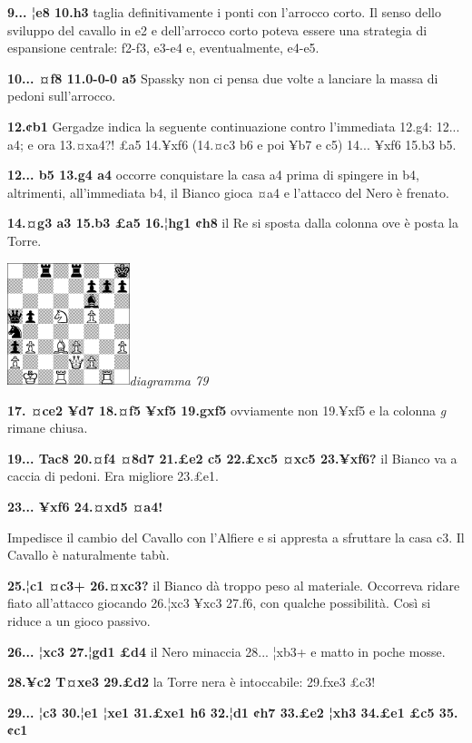 \documentclass[
]{article}
\begin{document}
\textbf{9... ¦e8 10.h3} taglia definitivamente i ponti con l'arrocco
corto. Il senso dello sviluppo del cavallo in e2 e dell'arrocco corto
poteva essere una strategia di espansione centrale: f2-f3, e3-e4 e,
eventualmente, e4-e5.

\textbf{10... ¤f8 11.0-0-0 a5} Spassky non ci pensa due volte a lanciare
la massa di pedoni sull'arrocco.

\textbf{12.¢b1} Gergadze indica la seguente continuazione contro
l'immediata 12.g4: 12... a4; e ora 13.¤xa4?! £a5 14.¥xf6 (14.¤c3 b6 e
poi ¥b7 e c5) 14... ¥xf6 15.b3 b5.

\textbf{12... b5 13.g4 a4} occorre conquistare la casa a4 prima di
spingere in b4, altrimenti, all'immediata b4, il Bianco gioca ¤a4 e
l'attacco del Nero è frenato.

\textbf{14.¤g3 a3 15.b3 £a5 16.¦hg1 ¢h8} il Re si sposta dalla colonna
ove è posta la Torre.

\includegraphics[width=1.40139in,height=1.40139in]{vertopal_109f12be458a423d8f3cc838880eaea2/media/image79.png}\emph{diagramma
79}

\textbf{17. ¤ce2 ¥d7 18.¤f5 ¥xf5 19.gxf5} ovviamente non 19.¥xf5 e la
colonna \emph{g} rimane chiusa.

\textbf{19... Tac8 20.¤f4 ¤8d7 21.£e2 c5 22.£xc5 ¤xc5 23.¥xf6?} il
Bianco va a caccia di pedoni. Era migliore 23.£e1.

\textbf{23... ¥xf6 24.¤xd5 ¤a4!}

Impedisce il cambio del Cavallo con l'Alfiere e si appresta a sfruttare
la casa c3. Il Cavallo è naturalmente tabù.

\textbf{25.¦c1 ¤c3+ 26.¤xc3?} il Bianco dà troppo peso al materiale.
Occorreva ridare fiato all'attacco giocando 26.¦xc3 ¥xc3 27.f6, con
qualche possibilità. Così si riduce a un gioco passivo.

\textbf{26... ¦xc3 27.¦gd1 £d4} il Nero minaccia 28... ¦xb3+ e matto in
poche mosse.

\textbf{28.¥c2 T¤xe3 29.£d2} la Torre nera è intoccabile: 29.fxe3 £c3!

\textbf{29... ¦c3 30.¦e1 ¦xe1 31.£xe1 h6 32.¦d1 ¢h7 33.£e2 ¦xh3 34.£e1
£c5 35.¢c1}
\end{document}
